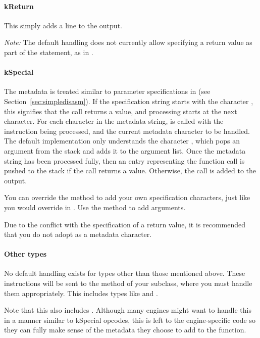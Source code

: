 \paragraph{kReturn}
This simply adds a line  to the output.

\emph{Note:} The default handling does not currently allow specifying a return value as part of the statement, as in .

\paragraph{kSpecial}
The metadata is treated similar to parameter specifications in  (see Section~\vref{sec:simpledisasm}). If the specification string starts with the character , this signifies that the call returns a value, and processing starts at the next character.
For each character in the metadata string,  is called with the instruction being processed, and the current metadata character to be handled. The default implementation only understands the character , which pops an argument from the stack and adds it to the argument list.
Once the metadata string has been processed fully, then an entry representing the function call is pushed to the stack if the call returns a value. Otherwise, the call is added to the output.

You can override the  method to add your own specification characters, just like you would override  in . Use the  method to add arguments.

Due to the conflict with the specification of a return value, it is recommended that you do not adopt  as a metadata character.

\paragraph{Other types}
No default handling exists for types other than those mentioned above. These instructions will be sent to the  method of your subclass, where you must handle them appropriately. This includes types like  and .

Note that this also includes . Although many engines might want to handle this in a manner similar to kSpecial opcodes, this is left to the engine-specific code so they can fully make sense of the metadata they choose to add to the function.

